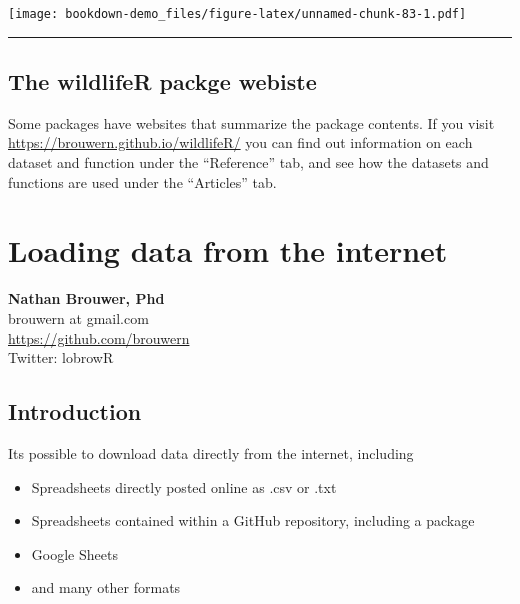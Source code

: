 \documentclass[]{book}
\newenvironment{Shaded}{\begin{snugshade}}{\end{snugshade}}
\newcommand{\KeywordTok}[1]{\textcolor[rgb]{0.13,0.29,0.53}{\textbf{#1}}}
\newcommand{\OperatorTok}[1]{\textcolor[rgb]{0.81,0.36,0.00}{\textbf{#1}}}
\newcommand{\NormalTok}[1]{#1}
\providecommand{\tightlist}{%
  \setlength{\itemsep}{0pt}\setlength{\parskip}{0pt}}
\theoremstyle{definition}
\theoremstyle{definition}
\theoremstyle{definition}
\theoremstyle{remark}
\begin{document}
\begin{Shaded}
\end{Shaded}

\texttt{[image: bookdown-demo\_files/figure-latex/unnamed-chunk-83-1.pdf]}

\begin{center}\rule{0.5\linewidth}{\linethickness}\end{center}

\section{\texorpdfstring{\protect\hyperlink{section-3}{} The wildlifeR
packge
webiste}{ The wildlifeR packge webiste}}\label{the-wildlifer-packge-webiste}

Some packages have websites that summarize the package contents. If you
visit \url{https://brouwern.github.io/wildlifeR/} you can find out
information on each dataset and function under the ``Reference'' tab,
and see how the datasets and functions are used under the ``Articles''
tab.

\chapter{Loading data from the
internet}\label{loading-data-from-the-internet}

\textbf{Nathan Brouwer, Phd}\\
brouwern at gmail.com\\
\url{https://github.com/brouwern}\\
Twitter: lobrowR

\section{Introduction}\label{introduction-3}

Its possible to download data directly from the internet, including

\begin{itemize}
\tightlist
\item
  Spreadsheets directly posted online as .csv or .txt
\item
  Spreadsheets contained within a GitHub repository, including a package
\item
  Google Sheets
\item
  and many other formats
\end{itemize}
\end{document}
